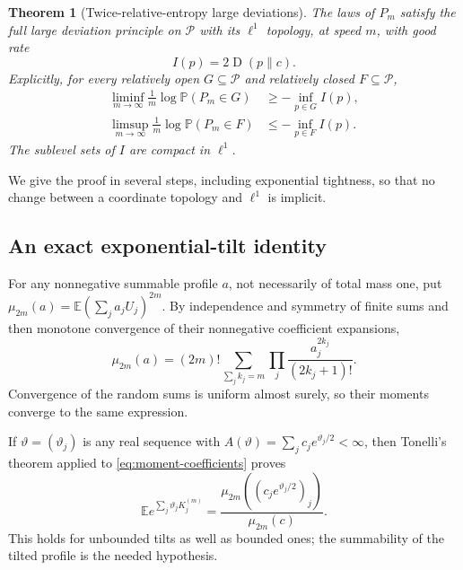 \documentclass[11pt,a4paper]{article}
\numberwithin{equation}{section}
\newtheorem{theorem}{Theorem}[section]
\theoremstyle{definition}
\theoremstyle{remark}
\newcommand{\E}{\mathbb E}
\newcommand{\PP}{\mathbb P}
\newcommand{\KL}{\operatorname{D}}
\newcommand{\simplex}{\mathcal P}
\begin{document}
\begin{theorem}[Twice-relative-entropy large deviations]
\label{thm:ldp}
The laws of $P_m$ satisfy the full large deviation principle on
$\simplex$ with its $\ell^1$ topology, at speed $m$, with good rate
\begin{equation}
I(p)=2\KL(p\|c).
\label{eq:rate}
\end{equation}
Explicitly, for every relatively open $G\subseteq\simplex$ and relatively
closed $F\subseteq\simplex$,
\begin{align}
\liminf_{m\to\infty}\frac1m\log\PP(P_m\in G)
&\ge-\inf_{p\in G}I(p),\label{eq:ldp-lower}\\
\limsup_{m\to\infty}\frac1m\log\PP(P_m\in F)
&\le-\inf_{p\in F}I(p).
\label{eq:ldp-upper}
\end{align}
The sublevel sets of $I$ are compact in $\ell^1$.
\end{theorem}

We give the proof in several steps, including exponential tightness, so
that no change between a coordinate topology and $\ell^1$ is implicit.

\subsection{An exact exponential-tilt identity}
For any nonnegative summable profile $a$, not necessarily of total mass
one, put $\mu_{2m}(a)=\E(\sum_ja_jU_j)^{2m}$.
By independence and symmetry of finite sums and then monotone convergence
of their nonnegative coefficient expansions,
\begin{equation}
\mu_{2m}(a)=(2m)!
\sum_{\sum_jk_j=m}\prod_j\frac{a_j^{2k_j}}{(2k_j+1)!}.
\label{eq:moment-coefficients}
\end{equation}
Convergence of the random sums is uniform almost surely, so their moments
converge to the same expression.

If $\vartheta=(\vartheta_j)$ is any real sequence with
$A(\vartheta)=\sum_jc_je^{\vartheta_j/2}<\infty$, then Tonelli's
theorem applied to \cref{eq:moment-coefficients} proves
\begin{equation}
\E e^{\sum_j\vartheta_jK_j^{(m)}}
=\frac{\mu_{2m}((c_je^{\vartheta_j/2})_j)}{\mu_{2m}(c)}.
\label{eq:tilt-identity}
\end{equation}
This holds for unbounded tilts as well as bounded ones; the summability of
the tilted profile is the needed hypothesis.
\end{document}

